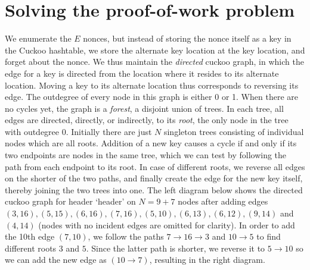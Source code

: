 \documentclass[11pt, oneside]{article}
\begin{document}
\section{Solving the proof-of-work problem}
We enumerate the $E$ nonces, but instead of storing the nonce itself as a key
in the Cuckoo hashtable, we store the alternate key location at the key location,
and forget about the nonce.
We thus maintain the {\em directed} cuckoo graph, in which the edge for a key
is directed from the location where it resides to its alternate location.
Moving a key to its alternate location thus corresponds to reversing its edge.
The outdegree of every node in this graph is either 0 or 1.
When there are no cycles yet, the graph is a {\em forest}, a disjoint union of trees.
In each tree, all edges are directed, directly, or indirectly, to its {\em root},
the only node in the tree with outdegree 0.
Initially there are just $N$ singleton trees consisting of individual nodes which are all roots.
Addition of a new key causes a cycle if and only if its two endpoints are nodes in the same tree,
which we can test by following the path from each endpoint to its root.
In case of different roots, we reverse all edges on the shorter of the two paths,
and finally create the edge for the new key itself, thereby joining the two trees into one.
The left diagram below shows the directed cuckoo graph for header `header' on $N=9+7$ nodes after adding edges
$(3,16),(5,15),(6,16),(7,16),(5,10),(6,13),(6,12),(9,14)$ and $(4,14)$ (nodes with no incident edges are omitted for clarity).
In order to add the 10th edge $(7,10)$, we follow the paths $7 \rightarrow 16 \rightarrow 3$ and $10 \rightarrow 5$
to find different roots $3$ and $5$. Since the latter path is shorter, we reverse it to $5 \rightarrow 10$ so we can
add the new edge as $(10 \rightarrow 7)$, resulting in the right diagram.
\end{document}
